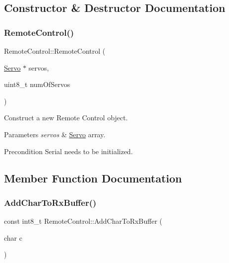 \subsection{Constructor \& Destructor Documentation}
\mbox{\label{classRemoteControl_a5d0cf2268dbecaae9b2526b6a9ea4e58}} 
\subsubsection{\texorpdfstring{RemoteControl()}{RemoteControl()}}
{\footnotesize\ttfamily Remote\+Control\+::\+Remote\+Control (\begin{DoxyParamCaption}\item[{\mbox{\hyperlink{classServo}{Servo}} $\ast$}]{servos,  }\item[{uint8\+\_\+t}]{num\+Of\+Servos }\end{DoxyParamCaption})}



Construct a new Remote Control object. 


\begin{DoxyParams}{Parameters}
{\em servos} & \mbox{\hyperlink{classServo}{Servo}} array.\\
\hline
\end{DoxyParams}
\begin{DoxyPrecond}{Precondition}
Serial needs to be initialized. 
\end{DoxyPrecond}


\subsection{Member Function Documentation}
\mbox{\label{classRemoteControl_a56e3105d14f9150e8c08ff2f6f480c85}} 
\subsubsection{\texorpdfstring{AddCharToRxBuffer()}{AddCharToRxBuffer()}}
{\footnotesize\ttfamily const int8\+\_\+t Remote\+Control\+::\+Add\+Char\+To\+Rx\+Buffer (\begin{DoxyParamCaption}\item[{char}]{c }\end{DoxyParamCaption})}



